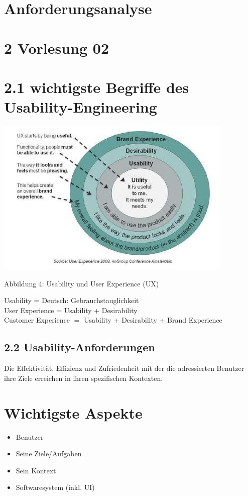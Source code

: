 \section{Anforderungsanalyse}

\section*{2 Vorlesung 02}
\section*{2.1 wichtigste Begriffe des Usability-Engineering}
\begin{center}
\includegraphics[width=\textwidth]{images/2024_12_29_0d1d7b5551ea1b4b41bdg-02}
\end{center}


Abbildung 4: Usability und User Experience (UX)


Usability = Deutsch: Gebrauchstauglichkeit\\
User Experience = Usability + Desirability\\
Customer Experience $=$ Usability + Desirability + Brand Experience

\subsection*{2.2 Usability-Anforderungen}
Die Effektivität, Effizienz und Zufriedenheit mit der die adressierten Benutzer ihre Ziele erreichen in ihren spezifischen Kontexten.

\section*{Wichtigste Aspekte}
\begin{itemize}
  \item Benutzer
  \item Seine Ziele/Aufgaben
  \item Sein Kontext
  \item Softwaresystem (inkl. UI)
\end{itemize}

